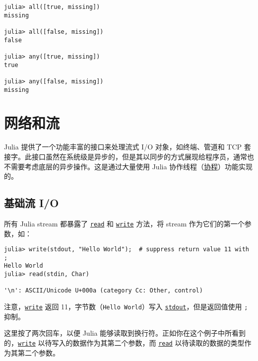 \begin{verbatim}
julia> all([true, missing])
missing

julia> all([false, missing])
false

julia> any([true, missing])
true

julia> any([false, missing])
missing
\end{verbatim}



\hypertarget{15469988008975030780}{}


\chapter{网络和流}



Julia 提供了一个功能丰富的接口来处理流式 I/O 对象，如终端、管道和 TCP 套接字。此接口虽然在系统级是异步的，但是其以同步的方式展现给程序员，通常也不需要考虑底层的异步操作。这是通过大量使用 Julia 协作线程（\hyperlink{17473131347184639576}{协程}）功能实现的。



\hypertarget{16725310763095786332}{}


\section{基础流 I/O}



所有 Julia stream 都暴露了 \hyperlink{8104134490906192097}{\texttt{read}} 和 \hyperlink{16947913578760238729}{\texttt{write}} 方法，将 stream 作为它们的第一个参数，如：




\begin{verbatim}
julia> write(stdout, "Hello World");  # suppress return value 11 with ;
Hello World
julia> read(stdin, Char)

'\n': ASCII/Unicode U+000a (category Cc: Other, control)
\end{verbatim}



注意，\hyperlink{16947913578760238729}{\texttt{write}} 返回 11，字节数（\texttt{{\textquotedbl}Hello World{\textquotedbl}}）写入 \hyperlink{18181294266083891471}{\texttt{stdout}}，但是返回值使用 \texttt{;} 抑制。



这里按了两次回车，以便 Julia 能够读取到换行符。正如你在这个例子中所看到的，\hyperlink{16947913578760238729}{\texttt{write}} 以待写入的数据作为其第二个参数，而 \hyperlink{8104134490906192097}{\texttt{read}} 以待读取的数据的类型作为其第二个参数。



